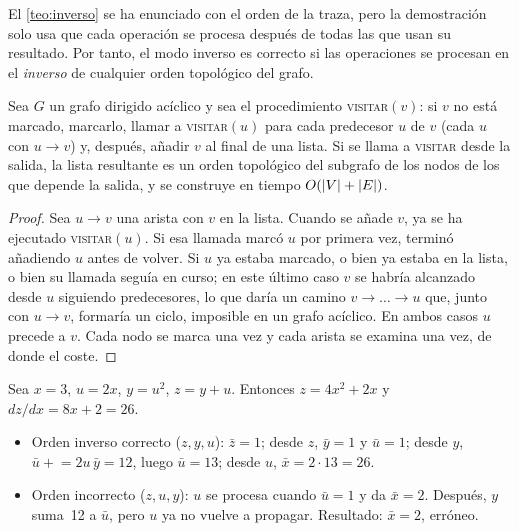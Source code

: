 El \cref{teo:inverso} se ha enunciado con el orden de la traza, pero la demostración solo usa que cada operación se procesa después de todas las que usan su resultado. Por tanto, el modo inverso es correcto si las operaciones se procesan en el \emph{inverso} de cualquier orden topológico del grafo.

\begin{proposicion}\label{prop:dfs}
Sea $G$ un grafo dirigido acíclico y sea el procedimiento \textsc{visitar}$(v)$: si $v$ no está marcado, marcarlo, llamar a \textsc{visitar}$(u)$ para cada predecesor $u$ de $v$ (cada $u$ con $u\to v$) y, después, añadir $v$ al final de una lista. Si se llama a \textsc{visitar} desde la salida, la lista resultante es un orden topológico del subgrafo de los nodos de los que depende la salida, y se construye en tiempo $O(\lvert V\rvert+\lvert E\rvert)$.
\end{proposicion}

\begin{proof}
Sea $u\to v$ una arista con $v$ en la lista. Cuando se añade $v$, ya se ha ejecutado \textsc{visitar}$(u)$. Si esa llamada marcó $u$ por primera vez, terminó añadiendo $u$ antes de volver. Si $u$ ya estaba marcado, o bien ya estaba en la lista, o bien su llamada seguía en curso; en este último caso $v$ se habría alcanzado desde $u$ siguiendo predecesores, lo que daría un camino $v\to\dots\to u$ que, junto con $u\to v$, formaría un ciclo, imposible en un grafo acíclico. En ambos casos $u$ precede a $v$. Cada nodo se marca una vez y cada arista se examina una vez, de donde el coste.
\end{proof}

\begin{ejemplo}\label{ej:orden}
Sea $x=3$, $u=2x$, $y=u^{2}$, $z=y+u$. Entonces $z=4x^{2}+2x$ y $dz/dx=8x+2=26$.
\begin{itemize}[leftmargin=1.4em]
  \item Orden inverso correcto ($z,y,u$): $\bar z=1$; desde $z$, $\bar y=1$ y $\bar u=1$; desde $y$, $\bar u\mathrel{+}=2u\,\bar y=12$, luego $\bar u=13$; desde $u$, $\bar x=2\cdot 13=26$.
  \item Orden incorrecto ($z,u,y$): $u$ se procesa cuando $\bar u=1$ y da $\bar x=2$. Después, $y$ suma~12 a $\bar u$, pero $u$ ya no vuelve a propagar. Resultado: $\bar x=2$, erróneo.
\end{itemize}
\end{ejemplo}

